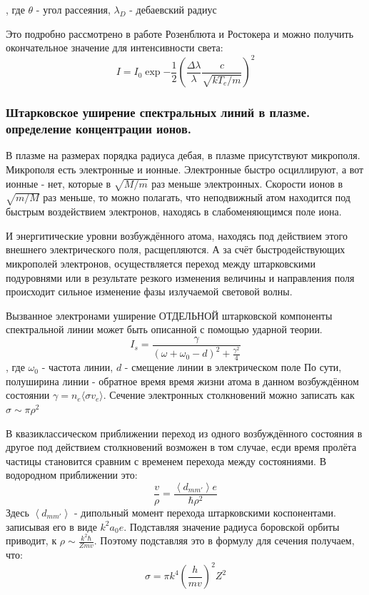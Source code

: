 \documentclass[10pt, a4paper]{article}
\begin{document}
, где $\theta$ - угол рассеяния, $\lambda_D$ - дебаевский радиус

Это подробно рассмотрено в работе Розенблюта и Ростокера и можно получить окончательное значение для интенсивности света:
\begin{equation}
	I=I_0 \exp{- \frac{1}{2} (\frac{\Delta \lambda}{\lambda} \frac{c}{\sqrt{kT_e /m}})^{2}}
\end{equation}


\subsubsection{ Штарковское уширение спектральных линий в плазме. определение концентрации ионов.}

В плазме на размерах порядка радиуса дебая, в плазме присутствуют микрополя. Микрополя есть электронные и ионные. Электронные быстро осциллируют, а вот ионные - нет, которые в $\sqrt{M/m}$ раз меньше электронных. Скорости ионов в $\sqrt{m/M}$ раз меньше, то можно полагать, что неподвижный атом находится под быстрым воздействием электронов, находясь в слабоменяющимся поле иона. 

И энергитические уровни возбуждённого атома, находясь под действием этого внешнего электрического поля, расщепляются. А за счёт быстродействующих микрополей электронов, осуществляется переход между штарковскими подуровнями или в результате резкого изменения величины и направления поля происходит сильное изменение фазы излучаемой световой волны. 

Вызванное электронами уширение ОТДЕЛЬНОЙ штарковской компоненты спектральной линии может быть описанной с помощью ударной теории.
\begin{equation}
	I_s=\frac{\gamma}{(\omega + \omega_0 - d)^{2}+ \frac{\gamma^{2}}{4}}
\end{equation}
, где $\omega_0$ - частота линии, $d$ -  смещение линии в электрическом поле
По сути, полуширина линии - обратное время время жизни атома в данном возбуждённом состоянии $\gamma =n_e \langle\sigma v_e\rangle$.
Сечение электронных столкновений можно записать как $\sigma \sim \pi \rho^{2}$

В квазиклассическом приближении переход из одного возбуждённого состояния в другое под действием столкновений возможен в том случае, есди время пролёта частицы становится сравним с временем перехода между состояниями. В водородном приближении это:
\begin{equation}
	\frac{v}{\rho}=\frac{\left\langle d_{m m'}\right\rangle  e}{\hbar \rho^2}
\end{equation}
Здесь $\left\langle d_{m m'}\right\rangle $ - дипольный момент перехода штарковскими коспонентами. записывая его в виде $k^2 a_{0} e$.
Подставляя значение радиуса боровской орбиты приводит, к $\rho \sim \frac{k^2 \hbar}{Zmv}$. Поэтому подставляя это в формулу для сечения получаем, что:
\begin{equation}
	\sigma = \pi k^4 \left(\frac{h}{mv}\right)^2 Z^2
\end{equation}
\end{document}
